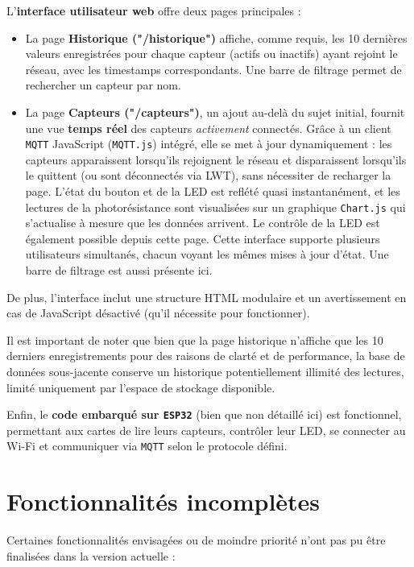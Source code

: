 \documentclass[12pt]{article}
\begin{document}
L'\textbf{interface utilisateur web} offre deux pages principales :
\begin{itemize}
    \item La page \textbf{Historique ("/historique")} affiche, comme requis, les 10 dernières valeurs enregistrées pour chaque capteur (actifs ou inactifs) ayant rejoint le réseau, avec les timestamps correspondants. Une barre de filtrage permet de rechercher un capteur par nom.
    \item La page \textbf{Capteurs ("/capteurs")}, un ajout au-delà du sujet initial, fournit une vue \textbf{temps réel} des capteurs \textit{activement} connectés. Grâce à un client \texttt{MQTT} JavaScript (\texttt{MQTT.js}) intégré, elle se met à jour dynamiquement : les capteurs apparaissent lorsqu'ils rejoignent le réseau et disparaissent lorsqu'ils le quittent (ou sont déconnectés via LWT), sans nécessiter de recharger la page. L'état du bouton et de la LED est reflété quasi instantanément, et les lectures de la photorésistance sont visualisées sur un graphique \texttt{Chart.js} qui s'actualise à mesure que les données arrivent. Le contrôle de la LED est également possible depuis cette page. Cette interface supporte plusieurs utilisateurs simultanés, chacun voyant les mêmes mises à jour d'état. Une barre de filtrage est aussi présente ici.
\end{itemize}
De plus, l'interface inclut une structure HTML modulaire et un avertissement en cas de JavaScript désactivé (qu'il
nécessite pour fonctionner).

Il est important de noter que bien que la page historique n'affiche que les 10 derniers enregistrements pour des raisons de clarté et de performance, la base de données sous-jacente conserve un historique potentiellement illimité des lectures, limité uniquement par l'espace de stockage disponible.

Enfin, le \textbf{code embarqué sur \texttt{ESP32}} (bien que non détaillé ici) est fonctionnel, permettant aux cartes de lire leurs capteurs, contrôler leur LED, se connecter au Wi-Fi et communiquer via \texttt{MQTT} selon le protocole défini.

\section{Fonctionnalités incomplètes}

Certaines fonctionnalités envisagées ou de moindre priorité n'ont pas pu être finalisées dans la version actuelle :
\end{document}
